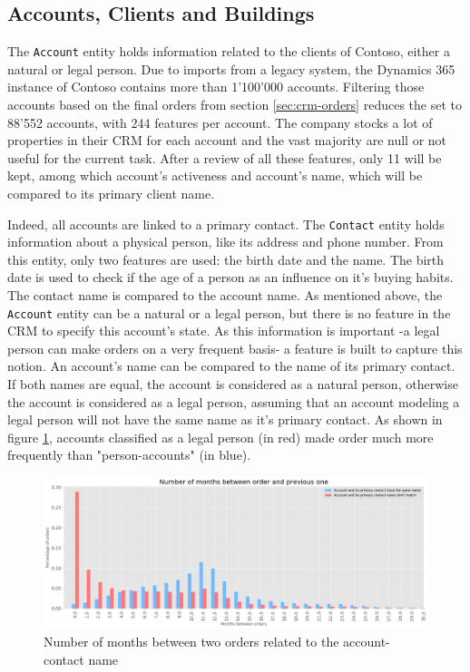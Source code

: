 \subsection{Accounts, Clients and Buildings}\label{sec:crm-accounts}
The \texttt{Account} entity holds information related to the clients of Contoso, either a natural or legal person. Due to imports from a legacy system, the Dynamics 365 instance of Contoso contains more than 1'100'000 accounts. Filtering those accounts based on the final orders from section \ref{sec:crm-orders} reduces the set to 88'552 accounts, with 244 features per account. The company stocks a lot of properties in their CRM for each account and the vast majority are null or not useful for the current task. After a review of all these features, only 11 will be kept, among which account's activeness and account's name, which will be compared to its primary client name.

Indeed, all accounts are linked to a primary contact. The \texttt{Contact} entity holds information about a physical person, like its address and phone number. From this entity, only two features are used: the birth date and the name. The birth date is used to check if the age of a person as an influence on it's buying habits. The contact name is compared to the account name. As mentioned above, the \texttt{Account} entity can be a natural or a legal person, but there is no feature in the CRM to specify this account's state. As this information is important -a legal person can make orders on a very frequent basis- a feature is built to capture this notion. An account's name can be compared to the name of its primary contact. If both names are equal, the account is considered as a natural person, otherwise the account is considered as a legal person, assuming that an account modeling a legal person will not have the same name as it's primary contact. As shown in figure \ref{fig:account-contact-name-orders}, accounts classified as a legal person (in red) made order much more frequently than "person-accounts" (in blue).

\begin{figure}[h]
    \centering
    \includegraphics[width=15cm]{images/account-contact-name-orders.png}
    \caption[Account and contact's name influence of order's frequency]{Number of months between two orders related to the account-contact name}
    \label{fig:account-contact-name-orders}
\end{figure}

